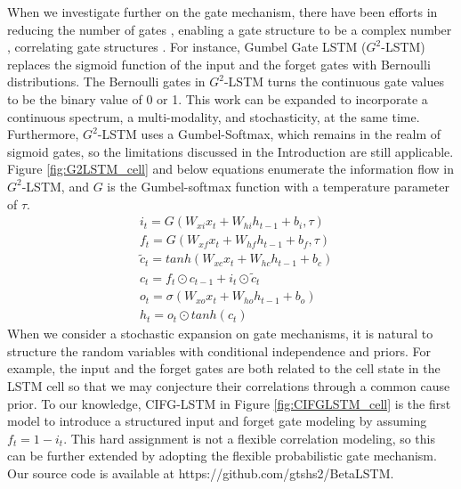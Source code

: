 \documentclass[letterpaper]{article} %
\begin{document}
When we investigate further on the gate mechanism, there have been efforts in reducing the number of gates \cite{sru}, enabling a gate structure to be a complex number \cite{NIPS2018_8253}, correlating gate structures \cite{greff2017lstm}. 
For instance, Gumbel Gate LSTM ($G^{2}$-LSTM) \cite{li2018towards} replaces the sigmoid function of the input and the forget gates with Bernoulli distributions. The Bernoulli gates in $G^{2}$-LSTM turns the continuous gate values to be the binary value of 0 or 1. 
This work can be expanded to incorporate a continuous spectrum, a multi-modality, and stochasticity, at the same time. Furthermore, $G^{2}$-LSTM uses a Gumbel-Softmax, which remains in the realm of sigmoid gates, so the limitations discussed in the Introduction are still applicable. Figure \ref{fig:G2LSTM_cell} and below equations enumerate the information flow in $G^{2}$-LSTM, and $G$ is the Gumbel-softmax function with a temperature parameter of $\tau$.
\begin{align}
	&i_{t} = G(W_{xi}x_{t}+W_{hi}h_{t-1}+b_{i},\tau) \\
	&f_{t} = G(W_{xf}x_{t}+W_{hf}h_{t-1}+b_{f},\tau) \\
	&\widetilde{c}_{t} = tanh(W_{xc}x_{t}+W_{hc}h_{t-1}+b_{c}) \\
	&c_{t} = f_{t} \odot c_{t-1} + i_{t} \odot \widetilde{c}_{t} \label{eq:G2_ct}\\
	&o_{t} = \sigma(W_{xo}x_{t}+W_{ho}h_{t-1}+b_{o}) \\
	&h_{t} = o_{t} \odot tanh(c_{t})
\end{align}
When we consider a stochastic expansion on gate mechanisms, it is natural to structure the random variables with conditional independence and priors. For example, the input and the forget gates are both related to the cell state in the LSTM cell so that we may conjecture their correlations through a common cause prior. To our knowledge, CIFG-LSTM in Figure \ref{fig:CIFGLSTM_cell} is the first model to introduce a structured input and forget gate modeling by assuming $f_{t}=1-i_{t}$. This hard assignment is not a flexible correlation modeling, so this can be further extended by adopting the flexible probabilistic gate mechanism. Our source code is available at https://github.com/gtshs2/BetaLSTM.
\end{document}
